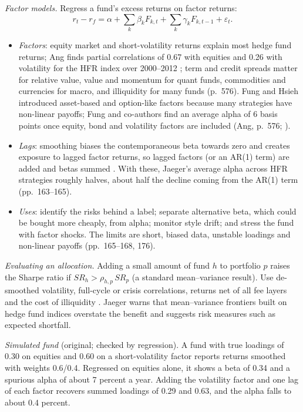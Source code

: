 \begin{qfmethod}\label{meth:hedge-fund-factor-exposures}
 \emph{Factor models.} Regress a fund's excess returns on factor returns:
\[
r_t-r_f=\alpha+\textstyle\sum_k\beta_k F_{k,t}+\sum_k\gamma_k F_{k,t-1}+\varepsilon_t .
\]
\begin{itemize}
\item \emph{Factors}: equity market and short-volatility returns explain most hedge fund returns; Ang finds partial correlations of 0.67 with equities and 0.26 with volatility for the HFR index over 2000--2012 \citep[pp.~572--573]{s7-ang}; term and credit spreads matter for relative value, value and momentum for quant funds, commodities and currencies for macro, and illiquidity for many funds (p.~576). Fung and Hsieh introduced asset-based and option-like factors because many strategies have non-linear payoffs; Fung and co-authors find an average alpha of 6 basis points once equity, bond and volatility factors are included (Ang, p.~576; \citep[pp.~161--162]{jaeger-alternative-beta-2008}).
\item \emph{Lags}: smoothing biases the contemporaneous beta towards zero and creates exposure to lagged factor returns, so lagged factors (or an AR(1) term) are added and betas summed \citep[pp.~21--22]{wide-getmansky-lo-makarov}. With these, Jaeger's average alpha across HFR strategies roughly halves, about half the decline coming from the AR(1) term (pp.~163--165).
\item \emph{Uses}: identify the risks behind a label; separate alternative beta, which could be bought more cheaply, from alpha; monitor style drift; and stress the fund with factor shocks. The limits are short, biased data, unstable loadings and non-linear payoffs (pp.~165--168, 176).
\end{itemize}

\emph{Evaluating an allocation.} Adding a small amount of fund $h$ to portfolio $p$ raises the Sharpe ratio if $SR_h>\rho_{h,p}\,SR_p$ (a standard mean--variance result). Use de-smoothed volatility, full-cycle or crisis correlations, returns net of all fee layers and the cost of illiquidity \citep[pp.~107--109]{jaeger-alternative-beta-2008}. Jaeger warns that mean--variance frontiers built on hedge fund indices overstate the benefit and suggests risk measures such as expected shortfall.

 \emph{Simulated fund} (original; checked by regression). A fund with true loadings of 0.30 on equities and 0.60 on a short-volatility factor reports returns smoothed with weights 0.6/0.4. Regressed on equities alone, it shows a beta of 0.34 and a spurious alpha of about 7 percent a year. Adding the volatility factor and one lag of each factor recovers summed loadings of 0.29 and 0.63, and the alpha falls to about 0.4 percent.


\end{qfmethod}
